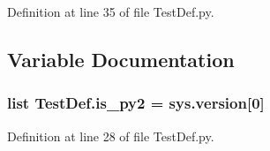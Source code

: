 Definition at line 35 of file Test\-Def.\-py.



\subsection{Variable Documentation}
\hypertarget{namespace_test_def_a4e87724b7a6a117c2cca22c557936868}{
\subsubsection[{is\-\_\-py2}]{\setlength{\rightskip}{0pt plus 5cm}list Test\-Def.\-is\-\_\-py2 = sys.\-version\mbox{[}0\mbox{]}}}\label{namespace_test_def_a4e87724b7a6a117c2cca22c557936868}


Definition at line 28 of file Test\-Def.\-py.

